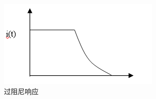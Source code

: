 
\begin{figure}[htbp]
\centering
\includegraphics{../../figure/guozuni.png}
\caption{过阻尼响应}
\label{guozuni}
\end{figure}